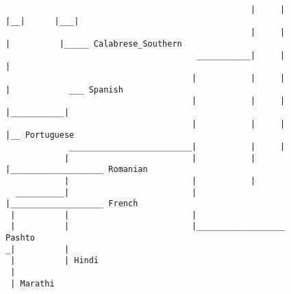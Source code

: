 \begin{figure}[H]
\begin{center}
{\begin{verbatim}
                                                  |     |     |__|      |___|
                                                  |     |        |          |_____ Calabrese_Southern
                                       ___________|     |        |
                                      |           |     |        |            ___ Spanish
                                      |           |     |        |___________|
                                      |           |     |                    |__ Portuguese
             _________________________|           |     |
            |                         |           |     |___________________ Romanian
            |                         |           |
  __________|                         |           |___________________ French
 |          |                         |
 |          |                         |__________________ Pashto
_|          |
 |          | Hindi
 |
 | Marathi



\end{verbatim}
}
\label{...}
\end{center}
\end{figure}
